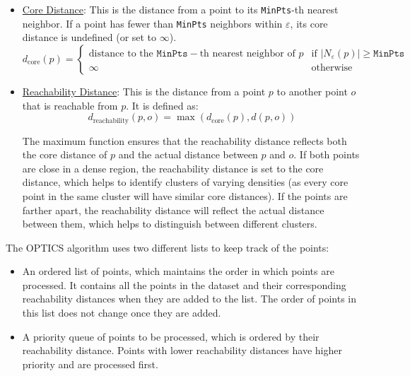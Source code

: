 \begin{itemize}
    \item \ul{Core Distance}: This is the distance from a point to its \texttt{MinPts}-th nearest neighbor. If a point has fewer than \texttt{MinPts} neighbors within $\varepsilon$, its core distance is undefined (or set to $\infty$).
    \begin{equation*}
        d_{\text{core}}(p) = \begin{cases}
            \text{distance to the } \texttt{MinPts}-\text{th nearest neighbor of } p & \text{if } |N_{\varepsilon}(p)| \geq \texttt{MinPts} \\
            \infty & \text{otherwise}
        \end{cases}
    \end{equation*}
    \item \ul{Reachability Distance}: This is the distance from a point $p$ to another point $o$ that is reachable from $p$. It is defined as:
    \begin{equation*}
        d_{\text{reachability}}(p, o) = \max(d_{\text{core}}(p), d(p, o))
    \end{equation*}

    The maximum function ensures that the reachability distance reflects both the core distance of $p$ and the actual distance between $p$ and $o$. If both points are close in a dense region, the reachability distance is set to the core distance, which helps to identify clusters of varying densities (as every core point in the same cluster will have similar core distances). If the points are farther apart, the reachability distance will reflect the actual distance between them, which helps to distinguish between different clusters.
\end{itemize}

The OPTICS algorithm uses two different lists to keep track of the points:
\begin{itemize}
    \item An ordered list of points, which maintains the order in which points are processed. It contains all the points in the dataset and their corresponding reachability distances when they are added to the list. The order of points in this list does not change once they are added.
    \item A priority queue of points to be processed, which is ordered by their reachability distance. Points with lower reachability distances have higher priority and are processed first.
\end{itemize}

